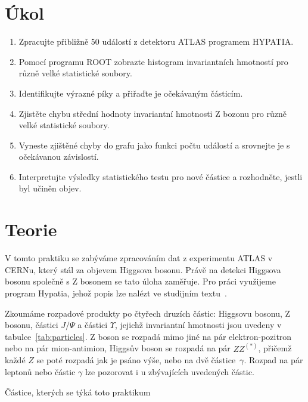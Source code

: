 \documentclass{scirep}
\begin{document}
    \section*{Úkol}

    \begin{enumerate}

        \item Zpracujte přibližně 50 událostí z detektoru ATLAS programem HYPATIA.
        \item Pomocí programu ROOT zobrazte histogram invariantních hmotností pro různě velké statistické soubory.
        \item Identifikujte výrazné píky a přiřaďte je očekávaným částicím.
        \item Zjistěte chybu střední hodnoty invariantní hmotnosti Z bozonu pro různě velké statistické soubory.
        \item Vyneste zjištěné chyby do grafu jako funkci počtu událostí a srovnejte je s očekávanou závislostí.
        \item Interpretujte výsledky statistického testu pro nové částice a rozhodněte, jestli byl učiněn objev.

    \end{enumerate}

    \section*{Teorie}

    V tomto praktiku se zabýváme zpracováním dat z experimentu ATLAS v CERNu, který stál za objevem Higgsova bosonu.
    Právě na detekci Higgsova bosonu společně s Z bosonem se tato úloha zaměřuje.
    Pro práci využijeme program Hypatia, jehož popis lze nalézt ve studijním textu~\cite{pokyny}.

    Zkoumáme rozpadové produkty po čtyřech druzích částic: Higgsovu bosonu, Z bosonu, částici $J / \Psi$ a částici $\Upsilon$, jejichž invariantní hmotnosti jsou uvedeny v tabulce~\ref{tab:particles}.
    Z boson se rozpadá mimo jiné na pár elektron-pozitron nebo na pár mion-antimion, Higgsův boson se rozpadá na pár $Z Z^{(*)}$, přičemž každé $Z$ se poté rozpadá jak je psáno výše, nebo na dvě částice~$\gamma$.
    Rozpad na pár leptonů nebo částic $\gamma$ lze pozorovat i u zbývajících uvedených částic.

    
\begin{table}[h]
    \centering
    \setlength{\tabcolsep}{15pt}
    
    \vspace{0pt}
    \caption{Částice, kterých se týká toto praktikum}
    \label{tab:particles}
\end{table}
\end{document}
